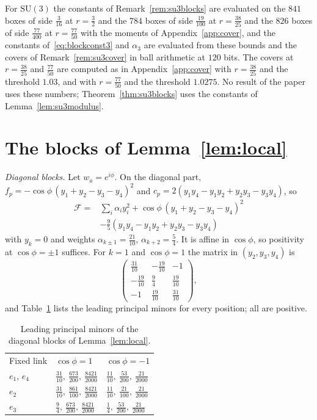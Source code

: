 \documentclass[aps,prd,twocolumn,superscriptaddress,nofootinbib,longbibliography,floatfix,amsmath,amssymb,10pt]{revtex4-2}
\theoremstyle{definition}
\theoremstyle{remark}
\newcommand{\SU}{\mathrm{SU}}
\begin{document}
For $\SU(3)$ the constants of Remark~\ref{rem:su3blocks} are evaluated on the
$841$ boxes of side $\frac3{16}$ at $r=\frac32$ and the $784$ boxes of side
$\frac{19}{100}$ at $r=\frac{38}{25}$ and the $826$ boxes of side
$\frac{77}{400}$ at $r=\frac{77}{50}$ with the moments of
Appendix~\ref{app:cover}, and the constants of~\eqref{eq:blockconst3} and
$\alpha_3$ are evaluated from these bounds and the covers of
Remark~\ref{rem:su3cover} in ball arithmetic at $120$ bits. The covers at
$r=\frac{38}{25}$ and $\frac{77}{50}$ are computed as in Appendix~\ref{app:cover} with $r=\frac{38}{25}$ and the
threshold $1.03$, and with $r=\frac{77}{50}$ and the threshold $1.0275$. No result of the paper uses these numbers; Theorem~\ref{thm:su3blocks}
uses the constants of Lemma~\ref{lem:su3modulus}.

\section{The blocks of Lemma~\ref{lem:local}}\label{app:blocks}

\emph{Diagonal blocks.} Let $w_a=e^{i\phi}$. On the diagonal part,
$f_p=-\cos\phi\,(y_1+y_2-y_3-y_4)^2$ and $c_p=2(y_1y_4-y_1y_2+y_2y_3-y_3y_4)$, so
\[
\begin{split}
\mathcal F={}&\sum_i\alpha_iy_i^2+\cos\phi\,(y_1+y_2-y_3-y_4)^2\\
&-\tfrac95(y_1y_4-y_1y_2+y_2y_3-y_3y_4)
\end{split}
\]
with $y_k=0$ and weights $\alpha_{k\pm1}=\frac{21}{10}$, $\alpha_{k+2}=\frac54$.
It is affine in $\cos\phi$, so positivity at $\cos\phi=\pm1$ suffices. For
$k=1$ and $\cos\phi=1$ the matrix in $(y_2,y_3,y_4)$ is
\[
\begin{pmatrix}\frac{31}{10}&-\frac{19}{10}&-1\\[2pt]-\frac{19}{10}&\frac94&
\frac{19}{10}\\[2pt]-1&\frac{19}{10}&\frac{31}{10}\end{pmatrix},
\]
and Table~\ref{tab:minors} lists the leading principal minors for every
position; all are positive.

\begin{table}[h]
\caption{Leading principal minors of the diagonal blocks of
Lemma~\ref{lem:local}.}
\label{tab:minors}
\begin{ruledtabular}
\begin{tabular}{lll}
Fixed link&$\cos\phi=1$&$\cos\phi=-1$\\
\colrule
$e_1$, $e_4$&$\frac{31}{10},\ \frac{673}{200},\ \frac{8421}{2000}$&
$\frac{11}{10},\ \frac{53}{200},\ \frac{21}{2000}$\\[2pt]
$e_2$&$\frac{31}{10},\ \frac{861}{100},\ \frac{8421}{2000}$&
$\frac{11}{10},\ \frac{21}{100},\ \frac{21}{2000}$\\[2pt]
$e_3$&$\frac94,\ \frac{673}{200},\ \frac{8421}{2000}$&
$\frac14,\ \frac{53}{200},\ \frac{21}{2000}$\\
\end{tabular}
\end{ruledtabular}
\end{table}
\end{document}
